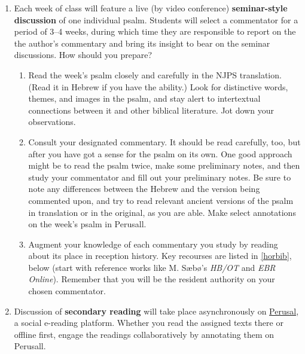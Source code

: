 \documentclass[titlepage]{article}
\begin{document}
\begin{enumerate}

	\item Each week of class will feature a live (by video conference)
	\textbf{seminar-style discussion} of one individual psalm. Students
	will select a commentator for a period of 3--4 weeks, during which
	time they are responsible to report on the the author's commentary
	and bring its insight to bear on the seminar discussions. How should
	you prepare?

	\begin{enumerate}

		\item Read the week's psalm closely and carefully in the NJPS
		translation. (Read it in Hebrew if you have the ability.) Look
		for distinctive words, themes, and images in the psalm, and stay
		alert to intertextual connections between it and other biblical
		literature. Jot down your observations.

		\item Consult your designated commentary. It should be read
		carefully, too, but after you have got a sense for the psalm on
		its own. One good approach might be to read the psalm twice,
		make some preliminary notes, and then study your commentator and
		fill out your preliminary notes. Be sure to note any differences
		between the Hebrew and the version being commented upon, and try
		to read relevant ancient versions of the psalm in translation or
		in the original, as you are able. Make select annotations on the
		week's psalm in Perusall.

		\item Augment your knowledge of each commentary you study by
		reading about its place in reception history. Key recourses are
		listed in \autoref{horbib}, below (start with reference works
		like M. Sæbø's \emph{HB/OT} and \emph{EBR Online}). Remember
		that you will be the resident authority on your chosen
		commentator.

	\end{enumerate}


	\item Discussion of \textbf{secondary reading} will take place
	asynchronously on \href{https://app.perusall.com/}{Perusal}, a
	social e-reading platform. Whether you read the assigned texts there
	or offline first, engage the readings collaboratively by annotating
	them on Perusall.

	\begin{enumerate}


\end{enumerate}
\end{enumerate}
\end{document}
